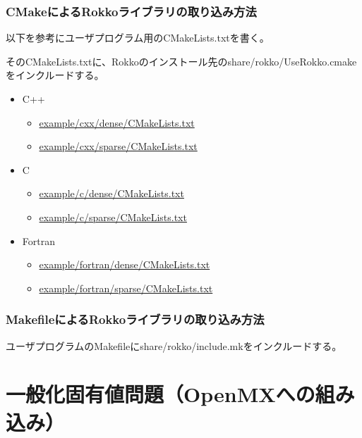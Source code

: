 \begin{frame}[c,fragile]
  \frametitle{CMakeによるRokkoライブラリの取り込み方法}
以下を参考にユーザプログラム用のCMakeLists.txtを書く。

そのCMakeLists.txtに、Rokkoのインストール先のshare/rokko/UseRokko.cmakeをインクルードする。

\begin{itemize}
  \item C++
    \begin{itemize}
    \item \href{https://github.com/t-sakashita/rokko/tree/develop/example/cxx/dense/CMakeLists.txt}{example/cxx/dense/CMakeLists.txt}
    \item \href{https://github.com/t-sakashita/rokko/tree/develop/example/cxx/sparse/CMakeLists.txt}{example/cxx/sparse/CMakeLists.txt}
    \end{itemize}
  \item C
    \begin{itemize}
    \item \href{https://github.com/t-sakashita/rokko/tree/develop/example/c/dense/CMakeLists.txt}{example/c/dense/CMakeLists.txt}
    \item \href{https://github.com/t-sakashita/rokko/tree/develop/example/c/sparse/CMakeLists.txt}{example/c/sparse/CMakeLists.txt}
    \end{itemize}
  \item Fortran
    \begin{itemize}
    \item \href{https://github.com/t-sakashita/rokko/tree/develop/example/fortran/dense/CMakeLists.txt}{example/fortran/dense/CMakeLists.txt}
    \item \href{https://github.com/t-sakashita/rokko/tree/develop/example/fortran/sparse/CMakeLists.txt}{example/fortran/sparse/CMakeLists.txt}
    \end{itemize}
  \end{itemize}
\end{frame}


\begin{frame}[c,fragile]
  \frametitle{MakefileによるRokkoライブラリの取り込み方法}
ユーザプログラムのMakefileにshare/rokko/include.mkをインクルードする。
\end{frame}

\section{一般化固有値問題（OpenMXへの組み込み）}

